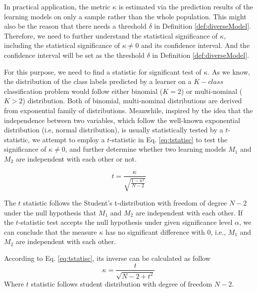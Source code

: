 \documentclass[prodmode,acmtkdd]{acmsmall}
\begin{document}
In practical application, the metric $\kappa$ is estimated via the
prediction results of the learning models on only a sample rather
than the whole population. This might also be the reason that there
needs a threshold $\delta$ in Definition \ref{def:diverseModel}.
Therefore, we need to further understand the statistical
significance of $\kappa$, including the statistical significance of
$\kappa\neq 0$ and its confidence interval. And the confidence
interval will be set as the threshold $\delta$ in Definition
\ref{def:diverseModel}.

For this purpose, we need to find a statistic for significant test
of $\kappa$. As we know, the distribution of the class labels
predicted by a learner on a $K-class$ classification problem would
follow either binomial ($K = 2$) or multi-nominal ($K > 2$)
distribution. Both of binomial, multi-nominal distributions are
derived from exponential family of distributions. Meanwhile,
inspired by the idea that the independence between two variables,
which follow the well-known exponential distribution (i.e, normal
distribution), is usually statistically tested by a $t$-statistic,
we attempt to employ a $t$-statistic in Eq. \ref{eq:tstatisc} to
test the significance of $\kappa \neq 0$, and further determine
whether two learning models $M_1$ and $M_2$ are independent with
each other or not.

\begin{equation}\label{eq:tstatisc}
    t = \frac{\kappa}{\sqrt{\frac{1-\kappa^2}{N-2}}}
\end{equation}

The $t$ statistic follows the Student's t-distribution with freedom
of degree $N-2$ under the null hypothesis that $M_1$ and $M_2$ are
independent with each other. If the $t$-statistic test accepts the
null hypothesis under given significance level $\alpha$, we can
conclude that the measure $\kappa$ has no significant difference
with 0, i.e., $M_1$ and $M_2$ are independent with each other.

According to Eq. \ref{eq:tstatisc}, its inverse can be calculated as
follow
\begin{equation}\label{eq:tinver}
    \kappa = \frac{t}{\sqrt{N - 2 + t^2}}
\end{equation}
Where $t$ statistic follows student distribution with degree of
freedom $N-2$.
\end{document}
